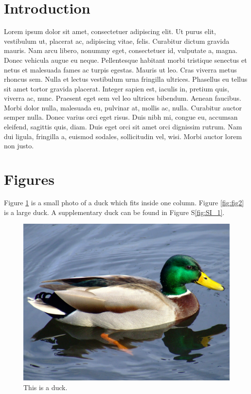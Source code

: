 \documentclass[twocolumn, switch]{article} %
\begin{document}

\section{Introduction}

Lorem ipsum dolor sit amet, consectetuer adipiscing elit. Ut purus elit, vestibulum ut, placerat ac, adipiscing vitae, felis. Curabitur dictum gravida mauris. Nam arcu libero, nonummy eget, consectetuer id, vulputate a, magna. Donec vehicula augue eu neque. Pellentesque habitant morbi tristique senectus et netus et malesuada fames ac turpis egestas. Mauris ut leo. Cras viverra metus rhoncus sem. Nulla et lectus vestibulum urna fringilla ultrices. Phasellus eu tellus sit amet tortor gravida placerat. Integer sapien est, iaculis in, pretium quis, viverra ac, nunc. Praesent eget sem vel leo ultrices bibendum. Aenean faucibus. Morbi dolor nulla, malesuada eu, pulvinar at, mollis ac, nulla. Curabitur auctor semper nulla. Donec varius orci eget risus. Duis nibh mi, congue eu, accumsan eleifend, sagittis quis, diam. Duis eget orci sit amet orci dignissim rutrum. Nam dui ligula, fringilla a, euismod sodales, sollicitudin vel, wisi. Morbi auctor lorem non justo. 

\section{Figures} 

Figure \ref{fig:fig1} is a small photo of a duck which fits inside one column. Figure \ref{fig:fig2} is a large duck. A supplementary duck can be found in Figure S\ref{fig:SI_1}. 

\begin{figure}
  \centering
  \includegraphics[scale=0.1]{duck1.jpg}
  \caption{This is a duck.}
  \label{fig:fig1}
\end{figure}
\end{document}
